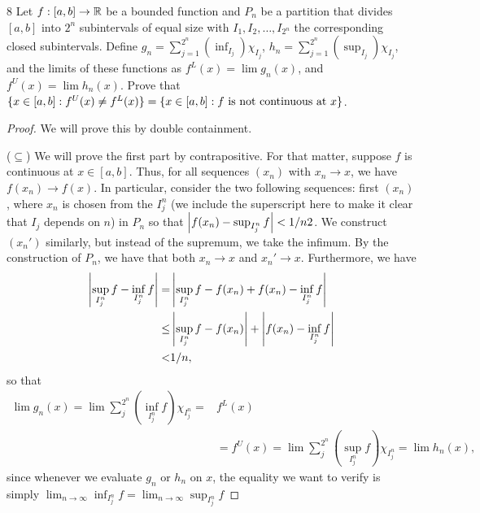 \begin{exercise}{8}
Let $f: [a,b] \to \mathbb{R}$ be a bounded function and $P_n$ be a partition that divides $[a,b]$ into $2^n$ subintervals of equal size with $I_1, I_2, \dots, I_{2^n}$ the corresponding closed subintervals.
Define $g_n = \sum_{j=1}^{2^n} (\inf_{I_j}) \chi_{I_j}$, $h_n = \sum_{j=1}^{2^n} (\sup_{I_j}) \chi_{I_j}$, and the limits of these functions as $f^L(x) = \lim g_n(x)$, and $f^U(x) = \lim h_n(x)$.
Prove that $\{x \in [a,b]: f^U(x) \neq f^L(x)\} = \{x \in [a,b]: f \text{ is not continuous at } x\}$.
\end{exercise}
\begin{proof}
We will prove this by double containment.

($\subseteq$)
We will prove the first part by contrapositive.
For that matter, suppose $f$ is continuous at $x \in [a,b]$.
Thus, for all sequences $(x_n)$ with $x_n \to x$, we have $f(x_n) \to f(x)$.
In particular, consider the two following sequences:
first $(x_n)$, where $x_n$ is chosen from the $I_j^n$ (we include the superscript here to make it clear that $I_j$ depends on $n$) in $P_n$ so that $\left\lvert f(x_n) - \sup_{I_j^n}f\right\rvert < 1/n2$.
We construct $(x_n')$ similarly, but instead of the supremum, we take the infimum.
By the construction of $P_n$, we have that both $x_n \to x$ and $x_n' \to x$.
Furthermore, we have 
\begin{align*}
    \left\lvert \sup_{I_j^n} f - \inf_{I_j^n} f\right\rvert
    =& \left\lvert \sup_{I_j^n} f - f(x_n) + f(x_n) - \inf_{I_j^n} f\right\rvert\\
    \leq& \left\lvert \sup_{I_j^n} f - f(x_n)\right\rvert 
        + \left\lvert f(x_n) - \inf_{I_j^n} f\right\rvert\\
    <& 1/n,
\end{align*}
so that 
\begin{align*}
    \lim g_n(x) 
    = \lim \sum_j^{2^n} (\inf_{I_j^n} f)\chi_{I_j^n} 
    =& f^L(x)\\ 
    &= f^U(x)
    = \lim \sum_j^{2^n} (\sup_{I_j^n} f)\chi_{I_j^n}
    = \lim h_n(x),
\end{align*}
since whenever we evaluate $g_n$ or $h_n$ on $x$, the equality we want to verify is simply $\lim_{n \to \infty} \inf_{I_j^n} f = \lim_{n \to \infty} \sup_{I_j^n} f$


\end{proof}

